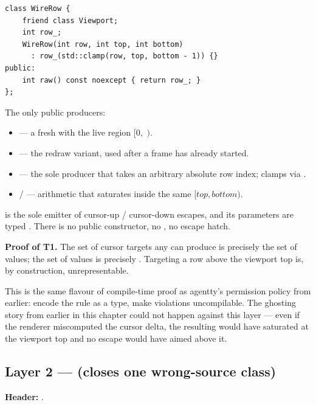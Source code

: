 \begin{lstlisting}
class WireRow {
    friend class Viewport;
    int row_;
    WireRow(int row, int top, int bottom)
      : row_(std::clamp(row, top, bottom - 1)) {}
public:
    int raw() const noexcept { return row_; }
};
\end{lstlisting}

The only public producers:

\begin{itemize}[leftmargin=*]
  \item {} --- a fresh
     with the live region $[0,$ $)$.
  \item {}
    --- the redraw variant, used after a frame has already started.
  \item {} --- the sole producer that takes
    an arbitrary absolute row index; clamps via .
  \item {} /  --- arithmetic that
    saturates inside the same $[top, bottom)$.
\end{itemize}

 is the sole emitter of cursor-up /
cursor-down escapes, and its parameters are typed .
There is no public  constructor, no
, no escape hatch.

\textbf{Proof of T1.} The set of cursor targets any 
can produce is precisely the set of  values; the set
of  values is precisely \code{Viewport::[top, bottom)}.
Targeting a row above the viewport top is, by construction,
unrepresentable.

This is the same flavour of compile-time proof as agentty's
permission policy from earlier: encode the rule as a type, make
violations uncompilable. The  ghosting story from
earlier in this chapter could not happen against this layer ---
even if the renderer miscomputed the cursor delta, the resulting
 would have saturated at the viewport top and no
escape would have aimed above it.

\subsection{Layer 2 ---  (closes one wrong-source class)}

\textbf{Header:} .

